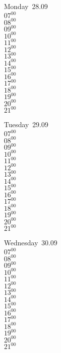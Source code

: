 \documentclass[11pt,a4paper]{book}\usepackage[]{graphicx}\usepackage[]{color}
\begin{document}
\begin{headerbox}
\end{headerbox}
\begin{weekdaybox}
  Monday~28.09\\
  { 
  \vfill
  $07^{00}$\\
$08^{00}$\\
$09^{00}$\\
$10^{00}$\\
$11^{00}$\\
$12^{00}$\\
$13^{00}$\\
$14^{00}$\\
$15^{00}$\\
$16^{00}$\\
$17^{00}$\\
$18^{00}$\\
$19^{00}$\\
$20^{00}$\\
$21^{00}$\\
  }
\end{weekdaybox}
\begin{weekdaybox}
  Tuesday~29.09\\
  { 
  \vfill
  $07^{00}$\\
$08^{00}$\\
$09^{00}$\\
$10^{00}$\\
$11^{00}$\\
$12^{00}$\\
$13^{00}$\\
$14^{00}$\\
$15^{00}$\\
$16^{00}$\\
$17^{00}$\\
$18^{00}$\\
$19^{00}$\\
$20^{00}$\\
$21^{00}$\\
  }
\end{weekdaybox}
\begin{weekdaybox}
  Wednesday~30.09\\
  { 
  \vfill
  $07^{00}$\\
$08^{00}$\\
$09^{00}$\\
$10^{00}$\\
$11^{00}$\\
$12^{00}$\\
$13^{00}$\\
$14^{00}$\\
$15^{00}$\\
$16^{00}$\\
$17^{00}$\\
$18^{00}$\\
$19^{00}$\\
$20^{00}$\\
$21^{00}$\\
  }
\end{weekdaybox}
\end{document}
